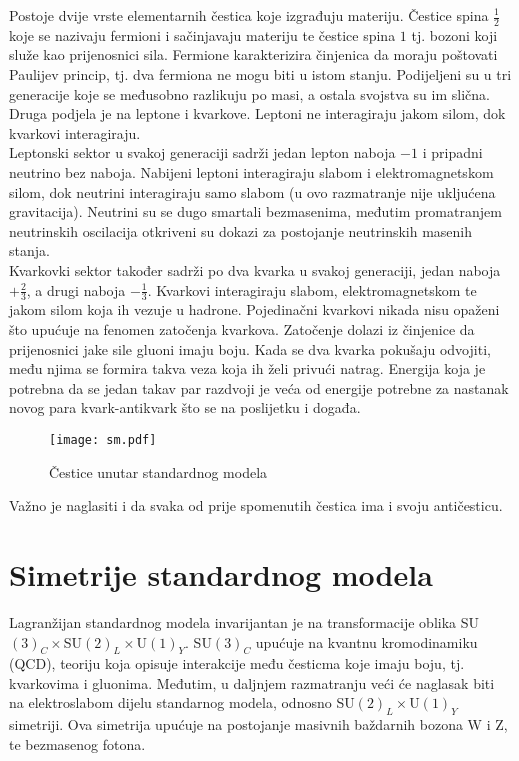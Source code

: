 \documentclass[a4paper,12pt]{report}
\begin{document}
Postoje dvije vrste elementarnih čestica koje izgrađuju materiju. Čestice spina $\frac{1}{2}$ koje se nazivaju fermioni i sačinjavaju materiju te čestice spina $1$ tj. bozoni koji služe kao prijenosnici sila. Fermione karakterizira činjenica da moraju poštovati Paulijev princip, tj. dva fermiona ne mogu biti u istom stanju. Podijeljeni su u tri generacije koje se međusobno razlikuju po masi, a ostala svojstva su im slična. Druga podjela je na leptone i kvarkove. Leptoni ne interagiraju jakom silom, dok kvarkovi interagiraju. \\
Leptonski sektor u svakoj generaciji sadrži jedan lepton naboja $-1$ i pripadni neutrino bez naboja. Nabijeni leptoni interagiraju slabom i elektromagnetskom silom, dok neutrini interagiraju samo slabom (u ovo razmatranje nije ukljućena gravitacija). Neutrini su se dugo smartali bezmasenima, međutim promatranjem neutrinskih oscilacija otkriveni su dokazi za postojanje neutrinskih masenih stanja. \cite{neutrini}\\
Kvarkovki sektor također sadrži po dva kvarka u svakoj generaciji, jedan naboja $+ \frac{2}{3}$, a drugi naboja $- \frac{1}{3}$. Kvarkovi interagiraju slabom, elektromagnetskom te jakom silom koja ih vezuje u hadrone. Pojedinačni kvarkovi nikada nisu opaženi što upućuje na fenomen zatočenja kvarkova. Zatočenje dolazi iz činjenice da prijenosnici jake sile gluoni imaju boju. Kada se dva kvarka pokušaju odvojiti, među njima se formira takva veza  koja ih želi privući natrag. Energija koja je potrebna da se jedan takav par razdvoji je veća od energije potrebne za nastanak novog para kvark-antikvark što se na poslijetku i događa.\\
\begin{figure}%
\centering
\texttt{[image: sm.pdf]}%
\caption{Čestice unutar standardnog modela}%
\label{fig:sm}%
\end{figure}
Važno je naglasiti i da svaka od prije spomenutih čestica ima i svoju antičesticu.

\section{Simetrije standardnog modela}

Lagranžijan standardnog modela invarijantan je na transformacije oblika SU$(3)_C\times$SU$(2)_L\times$U$(1)_Y$. SU$(3)_C$ upućuje na kvantnu kromodinamiku (QCD), teoriju koja opisuje interakcije među česticma koje imaju boju, tj. kvarkovima i gluonima. Međutim, u daljnjem razmatranju veći će naglasak biti na elektroslabom dijelu standarnog modela, odnosno SU$(2)_L\times$U$(1)_Y$ simetriji. Ova simetrija upućuje na postojanje masivnih baždarnih bozona W i Z, te bezmasenog fotona. 
\end{document}
